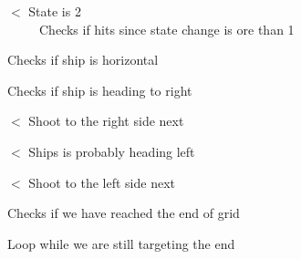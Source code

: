 $<$ State is 2 ~\newline
~\newline
~\newline
~\newline
~\newline
~\newline
~\newline
~\newline
~\newline
~\newline
~\newline
~\newline
~\newline
~\newline
~\newline
~\newline
~\newline
~\newline
~\newline
~\newline
~\newline
~\newline
~\newline
~\newline
~\newline
~\newline
~\newline
~\newline
~\newline
~\newline
~\newline
~\newline
~\newline
~\newline
~\newline
~\newline
~\newline
~\newline
~\newline
 Checks if hits since state change is ore than 1

Checks if ship is horizontal

Checks if ship is heading to right

$<$ Shoot to the right side next

$<$ Ships is probably heading left

$<$ Shoot to the left side next

Checks if we have reached the end of grid

Loop while we are still targeting the end

